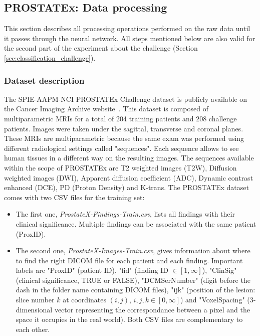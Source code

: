 \subsection{PROSTATEx: Data processing}
\label{sec:prostatex_data_processing}
\setlength{\marginparwidth}{3cm}\leavevmode {}This section describes all processing operations performed on the raw data until it passes through the neural network. All steps mentioned below are also valid for the second part of the experiment about the challenge (Section \ref{sec:classification_challenge}).


\subsubsection{Dataset description}
\label{sec:prostatex_dataset_description}
\setlength{\marginparwidth}{3cm}\leavevmode {}The SPIE-AAPM-NCI PROSTATEx Challenge dataset is publicly available on the Cancer Imaging Archive website~\cite{33, 34, 35}. This dataset is composed of multiparametric MRIs for a total of 204 training patients and 208 challenge patients. Images were taken under the sagittal, transverse and coronal planes. These MRIs are multiparametric because the same exam was performed using different radiological settings called "sequences". Each sequence allows to see human tissues in a different way on the resulting images. The sequences available within the scope of PROSTATEx are T2 weighted images (T2W), Diffusion weighted images (DWI), Apparent diffusion coefficient (ADC), Dynamic contrast enhanced (DCE), PD (Proton Density) and K-trans. The PROSTATEx dataset comes with two CSV files for the training set:
\begin{itemize}
\item The first one, \textit{ProstateX-Findings-Train.csv}, lists all findings with their clinical significance. Multiple findings can be associated with the same patient (ProxID).

\item The second one, \textit{ProstateX-Images-Train.csv}, gives information about where to find the right DICOM file for each patient and each finding. Important labels are "ProxID" (patient ID), "fid" (finding ID $\in [1,\infty]$), "ClinSig" (clinical significance, TRUE or FALSE), "DCMSerNumber" (digit before the dash in the folder name containing DICOM files), "ijk" (position of the lesion: slice number $k$ at coordinates $(i,j)$, $i,j,k \in [0,\infty]$) and "VoxelSpacing" (3-dimensional vector representing the correspondance between a pixel and the space it occupies in the real world). Both CSV files are complementary to each other. 
\end{itemize}

